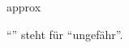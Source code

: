 \documentclass{stex}
\begin{document}
\begin{smodule}[sig=en]{approx}
\begin{sparagraph}[style=symdoc]
``'' steht für ``ungefähr''.
\end{sparagraph}
\end{smodule}
\end{document}
